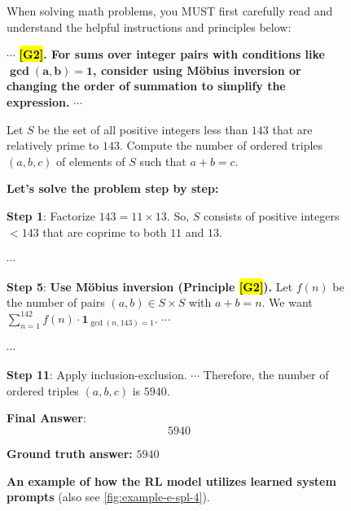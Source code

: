 \documentclass{article}
\theoremstyle{plain}
\theoremstyle{definition}
\theoremstyle{remark}
\begin{document}
\begin{figure}[!tb]
\centering
\vspace{-2pt}
\caption{\textbf{An example of how the RL model utilizes learned system prompts} (also see \autoref{fig:example-e-spl-4}).}
\vspace{-8pt}
\begin{runcard}[title={Example of How E-SPL Shapes Model Behavior}]

\medskip

\begin{runbox}[title={\textbf{Learned System Prompt}}]
When solving math problems, you MUST first carefully read and understand the helpful instructions and principles below:

$\cdots$ \quad \textbf{\color{Brown}\hl{{[G2]}}. For sums over integer pairs with conditions like $\boldsymbol{\gcd(a,b)=1}$, consider using Möbius inversion or changing the order of summation to simplify the expression.} \quad $\cdots$

\end{runbox}

\begin{runbox}[title={Problem}]
Let $S$ be the set of all positive integers less than $143$ that are relatively prime to $143$. Compute the number of ordered triples $(a,b,c)$ of elements of $S$ such that $a+b=c$.

\end{runbox}

\begin{runbox}[title={Model Output}]

\textbf{Let's solve the problem step by step:}

\textbf{Step 1}: Factorize \( 143 = 11 \times 13 \). So, \( S \) consists of positive integers \( < 143 \) that are coprime to both $11$ and $13$.

\quad $\cdots$

\textbf{Step 5}: {\textbf{\color{Brown}Use Möbius inversion (Principle \hl{[G2]}).} Let \( f(n) \) be the number of pairs \( (a, b) \in S \times S \) with \( a + b = n \). We want \( \sum_{n=1}^{142} f(n) \cdot \mathbf{1}_{\gcd(n,143)=1} \). \quad $\cdots$}

\quad $\cdots$

\textbf{Step 11}: Apply inclusion-exclusion. \quad $\cdots$ \quad Therefore, the number of ordered triples $(a,b,c)$ is $5940$.

\textbf{Final Answer}:
\[
\boxed{5940}
\]

\end{runbox}

\textbf{Ground truth answer:} $5940$
\end{runcard}
\label{fig:example-e-spl-4-short}

\vspace{-10pt}
\end{figure}
\end{document}
